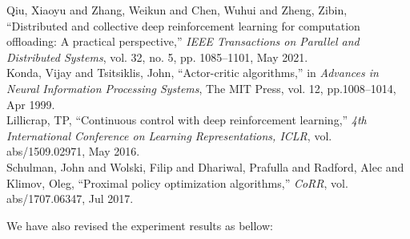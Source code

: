 \documentclass[12pt,draftclsnofoot,onecolumn]{IEEEtran}
\newcommand{\rev}[1]{{\color{blue}#1}} %
\newcommand{\rev}[1]{#1}
\newenvironment{my}[2]%
{\begin{list}{}%
{\setlength{\rightmargin}{#1}\setlength{\leftmargin}{#2}}%


 \item[]{}

} {\end{list}}
\begin{document}
\begin{enumerate}
\begin{my}{1cm}{1cm}
{{\begin{itemize}
\end{itemize}

}}
\end{my}\vspace{5mm}

	\begin{my}{1cm}{1cm}
	\rev{
		{\small
			\noindent\hspace{-0.5mm}\cite{qiu2020distributed} Qiu, Xiaoyu and Zhang, Weikun and Chen, Wuhui and Zheng, Zibin, ``Distributed and collective deep reinforcement learning for computation offloading: A practical perspective,'' \textit{IEEE Transactions on Parallel and Distributed Systems}, vol. 32, no. 5, pp. 1085--1101, May 2021.\\[10pt]
			\cite{NIPS1999_6449f44a} Konda, Vijay and Tsitsiklis, John, ``Actor-critic algorithms,'' in \textit{Advances in Neural Information Processing Systems}, The {MIT} Press, vol. 12, pp.1008--1014, Apr 1999.\\[10pt]
			\cite{lillicrap2015continuous} Lillicrap, TP, ``Continuous control with deep reinforcement learning,'' \textit{4th International Conference on Learning Representations, {ICLR}}, vol. abs/1509.02971, May 2016.\\[10pt]
			\cite{schulman2017proximal} Schulman, John and Wolski, Filip and Dhariwal, Prafulla and Radford, Alec and Klimov, Oleg, ``Proximal policy optimization algorithms,'' \textit{CoRR}, vol. abs/1707.06347, Jul 2017.}\\}
\end{my}




We have also revised the experiment results as bellow: 

\setcounter{figure}{2}


\end{enumerate}
\end{document}
